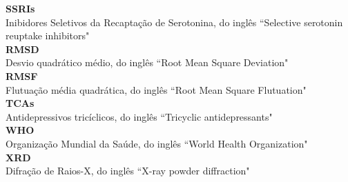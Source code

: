\textbf{SSRIs} \\ Inibidores Seletivos da Recaptação de Serotonina, do inglês ``Selective serotonin reuptake inhibitors" \\

\textbf{RMSD} \\  Desvio quadrático médio, do inglês ``Root Mean Square Deviation" \\

\textbf{RMSF} \\  Flutuação média quadrática, do inglês ``Root Mean Square Flutuation" \\

\textbf{TCAs} \\  Antidepressivos tricíclicos, do inglês ``Tricyclic antidepressants" \\

\textbf{WHO}  \\  Organização Mundial da Saúde, do inglês ``World Health Organization"\\

\textbf{XRD}  \\  Difração de Raios-X, do inglês ``X-ray powder diffraction"\\
